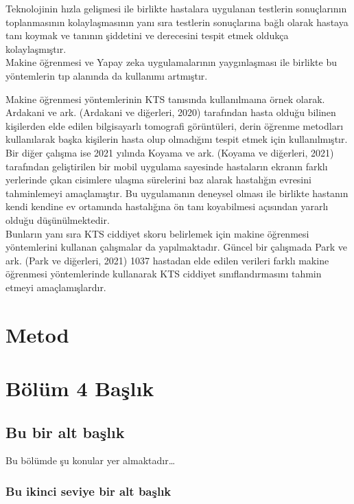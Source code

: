 \documentclass[12pt,twoside]{deuthesis}
\begin{document}
Teknolojinin hızla gelişmesi ile birlikte hastalara uygulanan testlerin sonuçlarının toplanmasının kolaylaşmasının yanı sıra testlerin sonuçlarına bağlı olarak hastaya tanı koymak ve tanının şiddetini ve derecesini tespit etmek oldukça kolaylaşmıştır.\\
Makine öğrenmesi ve Yapay zeka uygulamalarının yaygınlaşması ile birlikte bu yöntemlerin tıp alanında da kullanımı artmıştır.

Makine öğrenmesi yöntemlerinin KTS tanısında kullanılmaına örnek olarak.
Ardakani ve ark. (Ardakani ve diğerleri, 2020) tarafından hasta olduğu bilinen kişilerden elde edilen bilgisayarlı tomografi görüntüleri, derin öğrenme metodları kullanılarak başka kişilerin hasta olup olmadığını tespit etmek için kullanılmıştır.\\
Bir diğer çalışma ise 2021 yılında Koyama ve ark. (Koyama ve diğerleri, 2021) tarafından geliştirilen bir mobil uygulama sayesinde hastaların ekranın farklı yerlerinde çıkan cisimlere ulaşma sürelerini baz alarak hastalığın evresini tahminlemeyi amaçlamıştır. Bu uygulamanın deneysel olması ile birlikte hastanın kendi kendine ev ortamında hastalığına ön tanı koyabilmesi açısından yararlı olduğu düşünülmektedir.\\
Bunların yanı sıra KTS ciddiyet skoru belirlemek için makine öğrenmesi yöntemlerini kullanan çalışmalar da yapılmaktadır.
Güncel bir çalışmada Park ve ark. (Park ve diğerleri, 2021) 1037 hastadan elde edilen verileri farklı makine öğrenmesi yöntemlerinde kullanarak KTS ciddiyet sınıflandırmasını tahmin etmeyi amaçlamışlardır.
\pagebreak

\hypertarget{metod}{%
\chapter{Metod}\label{metod}}

\hypertarget{Bolum4}{%
\chapter{Bölüm 4 Başlık}\label{Bolum4}}

\hypertarget{bu-bir-alt-baux15flux131k}{%
\section{Bu bir alt başlık}\label{bu-bir-alt-baux15flux131k}}

Bu bölümde şu konular yer almaktadır\ldots{}

\hypertarget{bu-ikinci-seviye-bir-alt-baux15flux131k}{%
\subsection{Bu ikinci seviye bir alt başlık}\label{bu-ikinci-seviye-bir-alt-baux15flux131k}}
\end{document}
